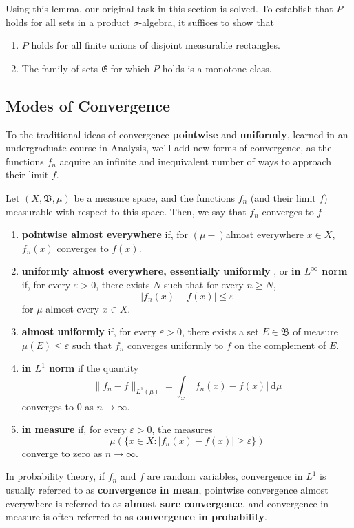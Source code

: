 \documentclass[12pt,a4paper]{article}
\theoremstyle{definition}
\begin{document}
Using this lemma, our original task in this section is solved. To establish that $P$ holds for all sets in a product $\sigma$-algebra, it suffices to show that 
\begin{enumerate}
	\item $P$ holds for all finite unions of disjoint measurable rectangles.
	\item The family of sets $\mathfrak{E}$ for which $P$ holds is a monotone class.
\end{enumerate}

\subsection{Modes of Convergence}

To the traditional ideas of convergence \textbf{pointwise} and \textbf{uniformly}, learned in an undergraduate course in Analysis, we'll add new forms of convergence, as the functions $f_n$ acquire an infinite and inequivalent number of ways to approach their limit $f$. 

Let $(X, \mathfrak{B}, \mu)$ be a measure space, and the functions $f_n$ (and their limit $f$) measurable with respect to this space. Then, we say that $f_n$ converges to $f$
\begin{enumerate}
	\item \textbf{pointwise almost everywhere} if, for $(\mu-)$almost everywhere $x \in X$, $f_n(x)$ converges to $f(x)$.
	\item \textbf{uniformly almost everywhere, essentially uniformly} , or \textbf{in $L^\infty$ norm} if, for every $\varepsilon > 0$, there exists $N$ such that for every $n \geq N$, \[ |f_n(x) - f(x)| \leq \varepsilon \] for $\mu$-almost every $x \in X$.
	\item \textbf{almost uniformly} if, for every $\varepsilon > 0$, there exists a set $E \in \mathfrak{B}$ of measure $\mu(E) \leq \varepsilon$ such that $f_n$ converges uniformly to $f$ on the complement of $E$.
	\item \textbf{in $L^1$ norm} if the quantity \[ \| f_n - f \|_{L^1(\mu)} = \int_x |f_n(x) - f(x)| ~\mathrm{d}\mu \] converges to $0$ as $n \to \infty$.
	\item \textbf{in measure} if, for every $\varepsilon > 0$, the measures \[ \mu (\{ x \in X : | f_n(x) - f(x) | \geq \varepsilon \}) \] converge to zero as $n \to \infty$.
\end{enumerate}

In probability theory, if $f_n$ and $f$ are random variables, convergence in $L^1$ is usually referred to as \textbf{convergence in mean}, pointwise convergence almost everywhere is referred to as \textbf{almost sure convergence}, and convergence in measure is often referred to as \textbf{convergence in probability}.
\end{document}

